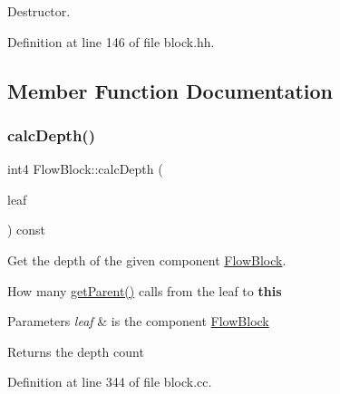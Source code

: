 Destructor. 



Definition at line 146 of file block.\+hh.



\subsection{Member Function Documentation}
\mbox{\label{class_flow_block_af611c90c1974b257161c37860065c011}} 
\subsubsection{\texorpdfstring{calcDepth()}{calcDepth()}}
{\footnotesize\ttfamily int4 Flow\+Block\+::calc\+Depth (\begin{DoxyParamCaption}\item[{const \mbox{\hyperlink{class_flow_block}{Flow\+Block}} $\ast$}]{leaf }\end{DoxyParamCaption}) const}



Get the depth of the given component \mbox{\hyperlink{class_flow_block}{Flow\+Block}}. 

How many \mbox{\hyperlink{class_flow_block_aa09d7d958c190fa86a30dbe9ac23c78f}{get\+Parent()}} calls from the leaf to {\bfseries{this}} 
\begin{DoxyParams}{Parameters}
{\em leaf} & is the component \mbox{\hyperlink{class_flow_block}{Flow\+Block}} \\
\hline
\end{DoxyParams}
\begin{DoxyReturn}{Returns}
the depth count 
\end{DoxyReturn}


Definition at line 344 of file block.\+cc.

